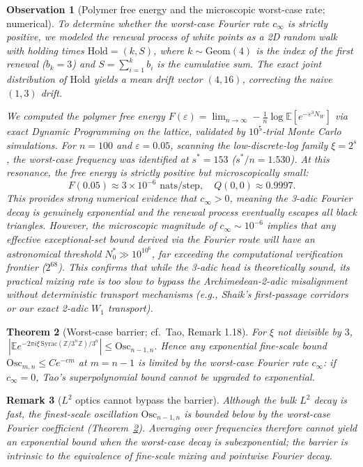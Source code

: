 \documentclass[12pt,a4paper]{article}
\newtheorem{theorem}{Theorem}[section]
\newtheorem{remark}[theorem]{Remark}
\newtheorem{observation}[theorem]{Observation}
\begin{document}
\begin{observation}[Polymer free energy and the microscopic worst-case rate; numerical]
\label{obs:polymer_free_energy}
To determine whether the worst-case Fourier rate $c_\infty$ is strictly positive, we modeled the renewal process of white points as a 2D random walk with holding times $\mathrm{Hold} = (k, S)$, where $k \sim \mathrm{Geom}(4)$ is the index of the first renewal ($b_k=3$) and $S = \sum_{i=1}^k b_i$ is the cumulative sum. The exact joint distribution of $\mathrm{Hold}$ yields a mean drift vector $(4, 16)$, correcting the naive $(1,3)$ drift.

We computed the polymer free energy $F(\varepsilon) = \lim_{n \to \infty} -\frac{1}{n} \log \mathbb{E}[e^{-\varepsilon^3 N_W}]$ via exact Dynamic Programming on the lattice, validated by $10^5$-trial Monte Carlo simulations. For $n=100$ and $\varepsilon=0.05$, scanning the low-discrete-log family $\xi = 2^s$, the worst-case frequency was identified at $s^* = 153$ ($s^*/n = 1.530$). At this resonance, the free energy is strictly positive but microscopically small:
\[
F(0.05) \approx 3 \times 10^{-6} \text{ nats/step}, \quad Q(0,0) \approx 0.9997.
\]
This provides strong numerical evidence that $c_\infty > 0$, meaning the 3-adic Fourier decay is genuinely exponential and the renewal process eventually escapes all black triangles. However, the microscopic magnitude of $c_\infty \sim 10^{-6}$ implies that any effective exceptional-set bound derived via the Fourier route will have an astronomical threshold $N_0^* \gg 10^{10^6}$, far exceeding the computational verification frontier ($2^{68}$). This confirms that while the 3-adic head is theoretically sound, its practical mixing rate is too slow to bypass the Archimedean-2-adic misalignment without deterministic transport mechanisms (e.g., Shaik's first-passage corridors or our exact 2-adic $W_1$ transport).
\end{observation}

\begin{theorem}[Worst-case barrier; cf.\ Tao, Remark 1.18]
\label{thm:barrier}
For $\xi$ not divisible by $3$,
$\ |\mathbb E e^{-2\pi i\xi\,\mathrm{Syrac}(\mathbb Z/3^n\mathbb Z)/3^n}|
\le\mathrm{Osc}_{n-1,n}.$
Hence any exponential fine-scale bound $\mathrm{Osc}_{m,n}\le Ce^{-cm}$ at
$m=n-1$ is limited by the worst-case Fourier rate $c_\infty$: if $c_\infty=0$,
Tao's superpolynomial bound cannot be upgraded to exponential.
\end{theorem}

\begin{remark}[$L^2$ optics cannot bypass the barrier]
Although the bulk $L^2$ decay is fast, the finest-scale oscillation
$\mathrm{Osc}_{n-1,n}$ is bounded \emph{below} by the worst-case Fourier
coefficient (Theorem~\ref{thm:barrier}). Averaging over frequencies therefore
cannot yield an exponential bound when the worst-case decay is subexponential;
the barrier is intrinsic to the equivalence of fine-scale mixing and pointwise
Fourier decay.
\end{remark}
\end{document}

